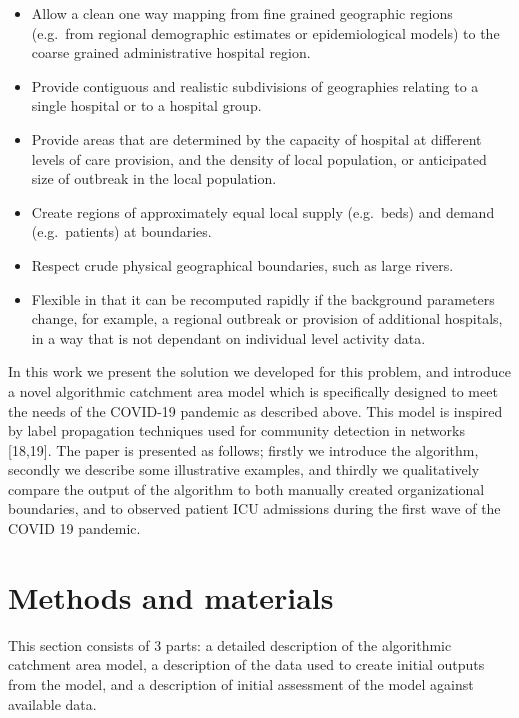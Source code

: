 \documentclass[
]{article}
\providecommand{\tightlist}{%
  \setlength{\itemsep}{0pt}\setlength{\parskip}{0pt}}
\begin{document}
\begin{itemize}
\tightlist
\item
  Allow a clean one way mapping from fine grained geographic regions
  (e.g.~from regional demographic estimates or epidemiological models)
  to the coarse grained administrative hospital region.
\item
  Provide contiguous and realistic subdivisions of geographies relating
  to a single hospital or to a hospital group.
\item
  Provide areas that are determined by the capacity of hospital at
  different levels of care provision, and the density of local
  population, or anticipated size of outbreak in the local population.
\item
  Create regions of approximately equal local supply (e.g.~beds) and
  demand (e.g.~patients) at boundaries.
\item
  Respect crude physical geographical boundaries, such as large rivers.
\item
  Flexible in that it can be recomputed rapidly if the background
  parameters change, for example, a regional outbreak or provision of
  additional hospitals, in a way that is not dependant on individual
  level activity data.
\end{itemize}

In this work we present the solution we developed for this problem, and
introduce a novel algorithmic catchment area model which is specifically
designed to meet the needs of the COVID-19 pandemic as described above.
This model is inspired by label propagation techniques used for
community detection in networks {[}18,19{]}. The paper is presented as
follows; firstly we introduce the algorithm, secondly we describe some
illustrative examples, and thirdly we qualitatively compare the output
of the algorithm to both manually created organizational boundaries, and
to observed patient ICU admissions during the first wave of the COVID 19
pandemic.

\hypertarget{methods-and-materials}{%
\section{Methods and materials}\label{methods-and-materials}}

This section consists of 3 parts: a detailed description of the
algorithmic catchment area model, a description of the data used to
create initial outputs from the model, and a description of initial
assessment of the model against available data.
\end{document}
